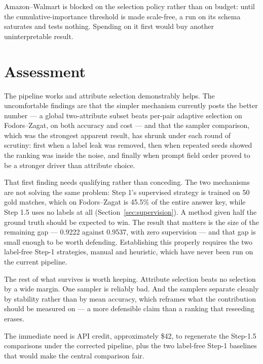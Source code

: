 \documentclass[11pt]{article}
\begin{document}
Amazon--Walmart is blocked on the selection policy rather than on budget: until the
cumulative-importance threshold is made scale-free, a run on its schema saturates and
tests nothing. Spending on it first would buy another uninterpretable result.

\section{Assessment}

The pipeline works and attribute selection demonstrably helps. The uncomfortable
findings are that the simpler mechanism currently posts the better number --- a global
two-attribute subset beats per-pair adaptive selection on Fodors--Zagat, on both
accuracy and cost --- and that the sampler comparison, which was the strongest
apparent result, has shrunk under each round of scrutiny: first when a label leak was
removed, then when repeated seeds showed the ranking was inside the noise, and finally
when prompt field order proved to be a stronger driver than attribute choice.

That first finding needs qualifying rather than conceding. The two mechanisms are not
solving the same problem: Step 1's supervised strategy is trained on 50 gold matches,
which on Fodors--Zagat is 45.5\% of the entire answer key, while Step 1.5 uses no
labels at all (Section~\ref{sec:supervision}). A method given half the ground truth
should be expected to win. The result that matters is the size of the remaining gap
--- 0.9222 against 0.9537, with zero supervision --- and that gap is small enough to
be worth defending. Establishing this properly requires the two label-free Step-1
strategies, manual and heuristic, which have never been run on the current pipeline.

The rest of what survives is worth keeping. Attribute selection beats no selection by
a wide margin. One sampler is reliably bad. And the samplers separate cleanly by
stability rather than by mean accuracy, which reframes what the contribution should be
measured on --- a more defensible claim than a ranking that reseeding erases.

The immediate need is API credit, approximately \$42, to regenerate the Step-1.5
comparisons under the corrected pipeline, plus the two label-free Step-1 baselines
that would make the central comparison fair.
\end{document}
